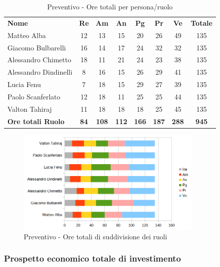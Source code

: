 		\begin{table} [h!]
			\begin{center}
				\begin{tabular} { m{3.5cm} c c c c c c c }
					\rowcolor{lightgray}
					\textbf{Nome} & \textbf{Re} & \textbf{Am} & \textbf{An} & \textbf{Pg} & \textbf{Pr} & \textbf{Ve} & \textbf{Totale} \\
					Matteo Alba & 12 & 13 & 15 & 20 & 26& 49 & 135 \\
					Giacomo Bulbarelli & 16 & 14 & 17 & 24 & 32 & 32 & 135 \\
					Alessandro Chimetto & 18 & 11 & 21 & 24 & 23 & 38 & 135 \\
					Alessandro Dindinelli & 8 & 16 & 15 & 26 & 29 & 41 & 135 \\
					Lucia Fenu & 7 & 18 & 15 & 29 & 27 & 39 & 135 \\
					Paolo Scanferlato & 12 & 18 & 11 & 25 & 25 & 44 & 135 \\
					Valton Tahiraj & 11 & 18 & 18 & 18 & 25 & 45 & 135 \\
					\textbf{Ore totali Ruolo} & \textbf{84} & \textbf{108} & \textbf{112} & \textbf{166} & \textbf{187}& \textbf{288} & \textbf{945}
				\end{tabular}
				\caption{Preventivo - Ore totali per persona/ruolo}
			\end{center}
		\end{table}
	
		\begin{figure} [h!]
			\centering
			\includegraphics[width=0.8\textwidth]{res/img/preventivi/totNONrend-barre.png}
			\caption{Preventivo - Ore totali di suddivisione dei ruoli} 
		\end{figure}
	
	\newpage
	
	\subsubsection{Prospetto economico totale di investimento}
	
